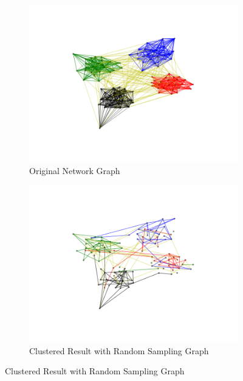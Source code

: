 \begin{figure}[h!]
        \centering
        \begin{subfigure}[h]{0.5\textwidth}
                \includegraphics[width=\textwidth]{fig/221.png}
                \caption{Original Network Graph}
                \label{fig:origin}
        \end{subfigure}%
        \begin{subfigure}[h]{0.5\textwidth}
                \includegraphics[width=\textwidth]{fig/222.png}
                \caption{Clustered Result with Random Sampling Graph}
                \label{fig:kmean}
        \end{subfigure}
          

\end{figure}
